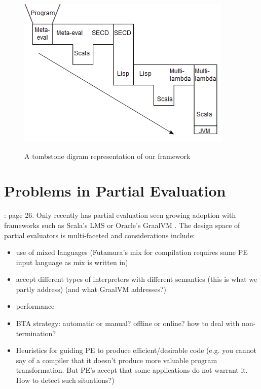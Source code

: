 \documentclass[fleqn]{article}
\theoremstyle{definition}
\begin{document}
\begin{figure}[t]
\centering
\includegraphics[scale=2]{tombstone_tower.png}
\label{fig:tombstone}
\caption{A tombstone digram representation of our framework}
\end{figure}

\section{Problems in Partial Evaluation}
\cite{jones1993partial}: page 26. Only recently has partial evaluation seen growing adoption with frameworks such as Scala's LMS \cite{rompf2010lightweight} or Oracle's GraalVM \cite{wurthinger2013one}. The design space of partial evaluators is multi-faceted and considerations include:
\begin{itemize}
	\item use of mixed languages (Futamura's mix for compilation requires same PE input language as mix is written in)
	\item accept different types of interpreters with different semantics (this is what we partly address) (and what GraalVM addresses?)
	\item performance
	\item BTA strategy: automatic or manual? offline or online? how to deal with non-termination?
	\item Heuristics for guiding PE to produce efficient/desirable code (e.g. you cannot say of a compiler that it doesn't produce more valuable program transformation. But PE's accept that some applications do not warrant it. How to detect such situations?)
\end{itemize}
\end{document}
